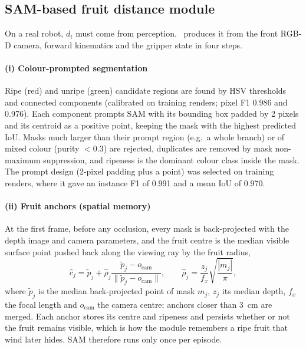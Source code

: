 \subsection{SAM-based fruit distance module}
\label{sec:fdm}
On a real robot, $d_t$ must come from perception. \fdm\ produces it from the front RGB-D camera, forward kinematics and the gripper state in four steps.

\paragraph{(i) Colour-prompted segmentation} Ripe (red) and unripe (green) candidate regions are found by HSV thresholds and connected components (calibrated on training renders; pixel F1 0.986 and 0.976). Each component prompts SAM \citep{kirillov2023sam} with its bounding box padded by 2 pixels and its centroid as a positive point, keeping the mask with the highest predicted IoU. Masks much larger than their prompt region (e.g.\ a whole branch) or of mixed colour (purity $<0.3$) are rejected, duplicates are removed by mask non-maximum suppression, and ripeness is the dominant colour class inside the mask. The prompt design (2-pixel padding plus a point) was selected on training renders, where it gave an instance F1 of 0.991 and a mean IoU of 0.970.

\paragraph{(ii) Fruit anchors (spatial memory)} At the first frame, before any occlusion, every mask is back-projected with the depth image and camera parameters, and the fruit centre is the median visible surface point pushed back along the viewing ray by the fruit radius,
\begin{equation}
\hat c_j = \tilde p_j + \hat\rho_j \frac{\tilde p_j - o_{\mathrm{cam}}}{\lVert \tilde p_j - o_{\mathrm{cam}} \rVert},\qquad \hat\rho_j = \frac{z_j}{f_x}\sqrt{\frac{|m_j|}{\pi}},
\end{equation}
where $\tilde p_j$ is the median back-projected point of mask $m_j$, $z_j$ its median depth, $f_x$ the focal length and $o_{\mathrm{cam}}$ the camera centre; anchors closer than 3~cm are merged. Each anchor stores its centre and ripeness and persists whether or not the fruit remains visible, which is how the module remembers a ripe fruit that wind later hides. SAM therefore runs only once per episode.


